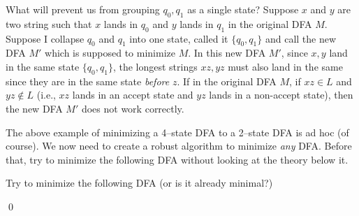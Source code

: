 What will prevent us from grouping $q_0, q_1$ as a single state?
Suppose $x$ and $y$ are two string such that
$x$ lands in $q_0$ and $y$ lands in $q_1$ in the original DFA $M$.
Suppose I collapse $q_0$ and $q_1$ into one state, called it $\{q_0, q_1\}$ and call the new DFA $M'$ which is supposed to minimize $M$.
In this new DFA $M'$, since $x,y$ land in the same state $\{q_0, q_1\}$, the longest strings $xz, yz$ must also land in the same since they are in the same state
\textit{before} $z$.
If in the original DFA $M$, if $xz \in L$ and $yz \not\in L$ (i.e., $xz$ lands in an accept state and $yz$ lands in a non-accept state), then the new DFA $M'$
does not work correctly.

The above example of minimizing a 4--state DFA to a 2--state
DFA is ad hoc (of course).
We now need to create a robust algorithm to minimize \textit{any} DFA.
Before that, try to minimize the following DFA without looking at the theory below it.

\newpage
\begin{ex}
  Try to minimize the following DFA (or is it already minimal?)

\begin{comment}
\begin{python}
from latextool_basic import *
print(automata(layout="""
A  B  E

C  D  F
""",
edges="A,$a$,B|A,$b$,C|B,$a$,E|B,$b$,C|C,$b$,F|C,$a$,D|D,$a$,B|D,$b$,A|E,$a$,F|E,$b$,D|F,$a$,B|F,$b$,D",
A='initial|label=$q_0$',
B='label=$q_1$',
C='accept|label=$q_3$',
D='label=$q_4$',
E='label=$q_2$',
F='accept|label=$q_5$', xscale=1.3,
))
\end{python}
\end{comment}

\begin{center}
\end{center}
    
\qed
\end{ex}

